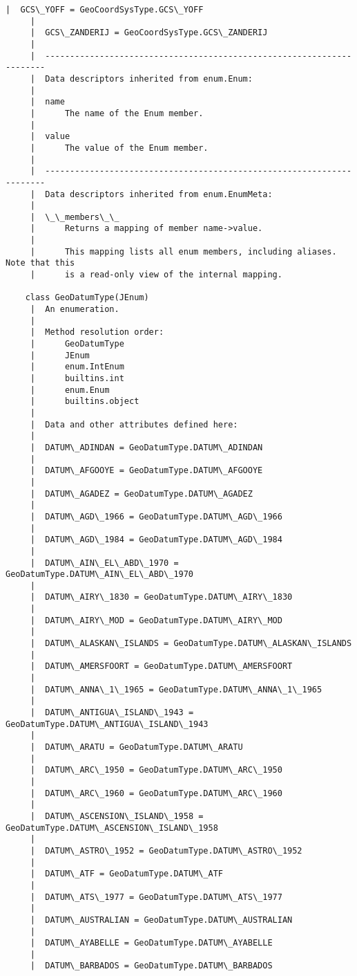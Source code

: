 \documentclass[11pt]{article}
\begin{document}
\begin{Verbatim}[commandchars=\\\{\}]
     |  GCS\_YOFF = GeoCoordSysType.GCS\_YOFF
     |  
     |  GCS\_ZANDERIJ = GeoCoordSysType.GCS\_ZANDERIJ
     |  
     |  ----------------------------------------------------------------------
     |  Data descriptors inherited from enum.Enum:
     |  
     |  name
     |      The name of the Enum member.
     |  
     |  value
     |      The value of the Enum member.
     |  
     |  ----------------------------------------------------------------------
     |  Data descriptors inherited from enum.EnumMeta:
     |  
     |  \_\_members\_\_
     |      Returns a mapping of member name->value.
     |      
     |      This mapping lists all enum members, including aliases. Note that this
     |      is a read-only view of the internal mapping.
    
    class GeoDatumType(JEnum)
     |  An enumeration.
     |  
     |  Method resolution order:
     |      GeoDatumType
     |      JEnum
     |      enum.IntEnum
     |      builtins.int
     |      enum.Enum
     |      builtins.object
     |  
     |  Data and other attributes defined here:
     |  
     |  DATUM\_ADINDAN = GeoDatumType.DATUM\_ADINDAN
     |  
     |  DATUM\_AFGOOYE = GeoDatumType.DATUM\_AFGOOYE
     |  
     |  DATUM\_AGADEZ = GeoDatumType.DATUM\_AGADEZ
     |  
     |  DATUM\_AGD\_1966 = GeoDatumType.DATUM\_AGD\_1966
     |  
     |  DATUM\_AGD\_1984 = GeoDatumType.DATUM\_AGD\_1984
     |  
     |  DATUM\_AIN\_EL\_ABD\_1970 = GeoDatumType.DATUM\_AIN\_EL\_ABD\_1970
     |  
     |  DATUM\_AIRY\_1830 = GeoDatumType.DATUM\_AIRY\_1830
     |  
     |  DATUM\_AIRY\_MOD = GeoDatumType.DATUM\_AIRY\_MOD
     |  
     |  DATUM\_ALASKAN\_ISLANDS = GeoDatumType.DATUM\_ALASKAN\_ISLANDS
     |  
     |  DATUM\_AMERSFOORT = GeoDatumType.DATUM\_AMERSFOORT
     |  
     |  DATUM\_ANNA\_1\_1965 = GeoDatumType.DATUM\_ANNA\_1\_1965
     |  
     |  DATUM\_ANTIGUA\_ISLAND\_1943 = GeoDatumType.DATUM\_ANTIGUA\_ISLAND\_1943
     |  
     |  DATUM\_ARATU = GeoDatumType.DATUM\_ARATU
     |  
     |  DATUM\_ARC\_1950 = GeoDatumType.DATUM\_ARC\_1950
     |  
     |  DATUM\_ARC\_1960 = GeoDatumType.DATUM\_ARC\_1960
     |  
     |  DATUM\_ASCENSION\_ISLAND\_1958 = GeoDatumType.DATUM\_ASCENSION\_ISLAND\_1958
     |  
     |  DATUM\_ASTRO\_1952 = GeoDatumType.DATUM\_ASTRO\_1952
     |  
     |  DATUM\_ATF = GeoDatumType.DATUM\_ATF
     |  
     |  DATUM\_ATS\_1977 = GeoDatumType.DATUM\_ATS\_1977
     |  
     |  DATUM\_AUSTRALIAN = GeoDatumType.DATUM\_AUSTRALIAN
     |  
     |  DATUM\_AYABELLE = GeoDatumType.DATUM\_AYABELLE
     |  
     |  DATUM\_BARBADOS = GeoDatumType.DATUM\_BARBADOS

\end{Verbatim}
\end{document}
